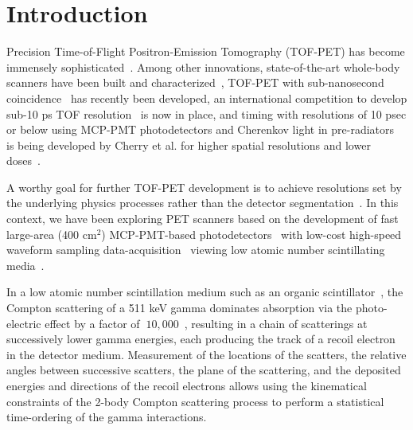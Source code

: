 \documentclass[12pt]{article}
\begin{document}
\newpage
\tableofcontents

\listoffigures

\listoftables

\newpage
\section{Introduction}




Precision Time-of-Flight Positron-Emission Tomography (TOF-PET) has
become immensely
sophisticated~\cite{Vandenberghe_Moskal_Karp_review_2020,Vaquero_Kinehan_review_2015,Phelps_Cherry_Dahlbom_book_2006}.
Among other innovations, state-of-the-art whole-body scanners have been
built and
characterized~\cite{Vandenberghe_Moskal_Karp_2020_Whole_Body_PET_2020,Cherry_Explorer_scattering_2019},
TOF-PET with sub-nanosecond coincidence~\cite{Lee_Levin_100ps_2021} has
recently been developed, an international competition to develop sub-10
ps TOF resolution~\cite{lecoq_2019} is now in place, and timing with
resolutions of 10 psec or below using MCP-PMT photodetectors and
Cherenkov light in
pre-radiators~\cite{Credo,Ohshima,Anatoly_TestBeam_2010} is being
developed by Cherry et al. for higher spatial resolutions and lower
doses~\cite{Cherry_Hamamatsu_2021}.

A worthy goal for further TOF-PET development is to achieve resolutions
set by the underlying physics processes rather than the detector
segmentation~\cite{Moses_Fundamental_Limits}. In this context, we have
been exploring PET scanners based on the development of fast large-area
(400 cm$^2$) MCP-PMT-based
photodetectors~\cite{history_paper,timing_paper,Limitations_Workshop_2011,Andrey_paper_1}
 with low-cost high-speed waveform sampling data-acquisition~\cite{PSEC4, OTPC_paper}
viewing low atomic number scintillating
media~\cite{Moskal_Organic_Scint_2012,PET_NIM_paper,PET_patent}.


In a low atomic number scintillation medium such as an organic
scintillator~\cite{Kamland-Zen}, the Compton scattering of a 511 keV
gamma dominates absorption via the photo-electric effect by a factor of
$~10,000$~\cite{cross_sections}, resulting in a chain of scatterings at
successively lower gamma energies, each producing the track of a recoil
electron in the detector medium. Measurement of the locations of the
scatters, the relative angles between successive scatters, the plane of
the scattering, and the deposited energies and directions of the recoil
electrons allows using the kinematical constraints of the 2-body
Compton scattering process to perform a statistical time-ordering of
the gamma interactions.
\end{document}
